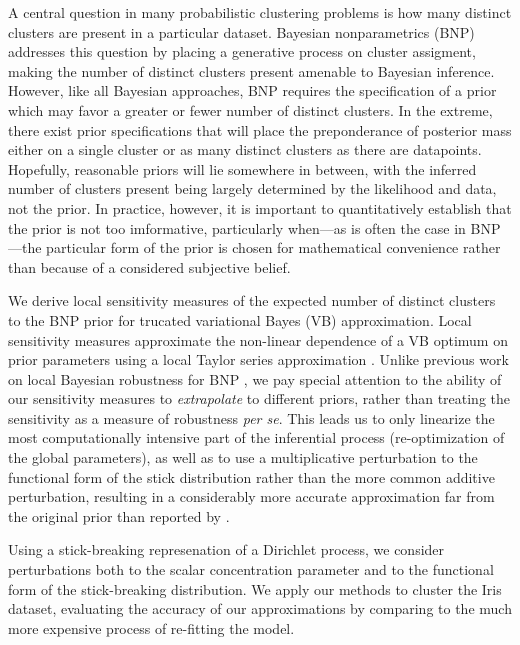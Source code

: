 
A central question in many probabilistic clustering problems is how many
distinct clusters are present in a particular dataset.
Bayesian nonparametrics (BNP) addresses this question by placing a generative
process on cluster assigment, making the number of distinct clusters present
amenable to Bayesian inference.  However, like all Bayesian approaches, BNP
requires the specification of a prior which may favor a greater or fewer number
of distinct clusters.  In the extreme, there exist prior specifications that
will place the preponderance of posterior mass either on a single cluster or as
many distinct clusters as there are datapoints.  Hopefully, reasonable priors
will lie somewhere in between, with the inferred number of clusters present
being largely determined by the likelihood and data, not the prior.  In
practice, however, it is important to quantitatively establish that the prior is
not too imformative, particularly when---as is often the case in BNP---the
particular form of the prior is chosen for mathematical convenience rather than
because of a considered subjective belief.

We derive local sensitivity measures of the expected number of distinct clusters
to the BNP prior for trucated variational Bayes (VB) approximation.  Local
sensitivity measures approximate the non-linear dependence of a VB optimum on
prior parameters using a local Taylor series approximation
\citep{gustafson:1996:localposterior, giordano:2017:covariances}. Unlike
previous work on local Bayesian robustness for BNP
\citep{Basu:2000:BNP_robustness}, we pay special attention to the ability of our
sensitivity measures to \emph{extrapolate} to different priors, rather than
treating the sensitivity as a measure of robustness \textit{per se}.  This leads
us to only linearize the most computationally intensive part of the inferential
process (re-optimization of the global parameters), as well as to use a
multiplicative perturbation to the functional form of the stick distribution
rather than the more common additive perturbation, resulting in a considerably
more accurate approximation far from the original prior than
reported by \citet{Basu:2000:BNP_robustness}.

Using a stick-breaking represenation of a Dirichlet process, we consider
perturbations both to the scalar concentration parameter and to the functional
form of the stick-breaking distribution. We apply our methods to cluster the
Iris \citep{iris_data_anderson, iris_data_fisher} dataset, evaluating the
accuracy of our approximations by comparing to the much more expensive process
of re-fitting the model.

